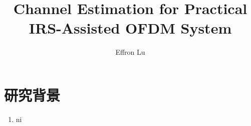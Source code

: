 \documentclass[geye,green,normal,cn,founder]{elegantnote}
\title{Channel Estimation for Practical IRS-Assisted OFDM System}
\author{Effron Lu}
\institute{SEU}
\date{\zhdate{2021/03/07}}
\begin{document}
\maketitle 
\section{研究背景}
\begin{enumerate}
    \item ni
\end{enumerate}
\end{document}
